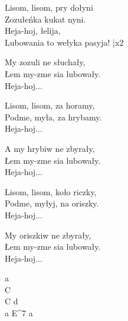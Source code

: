\begin{text}
    Lisom, lisom, pry dołyni\\
    Zozułeńka kukat nyni.\\
    \vin Heja-hoj, łelija,\\
    \vin Lubowania to wełyka pasyja! |x2
    
    My zozuli ne słuchały,\\
    Łem my-zme sia lubowały.\\
    \vin Heja-hoj...
    
    Lisom, lisom, za horamy,\\
    Podme, myła, za hrybamy.\\
    \vin Heja-hoj...
    
    A my hrybiw ne zbyrały,\\
    Łem my-zme sia lubowały.\\
    \vin Heja-hoj...
    
    Lisom, lisom, koło riczky,\\
    Podme, myłyj, na oriszky.\\
    \vin Heja-hoj...
    
    My oriszkiw ne zbyrały,\\
    Łem my-zme sia lubowały.\\
    \vin Heja-hoj...
\end{text}
\begin{chord}
    a\\
    C\\
    C d\\
    a E^7 a
\end{chord}